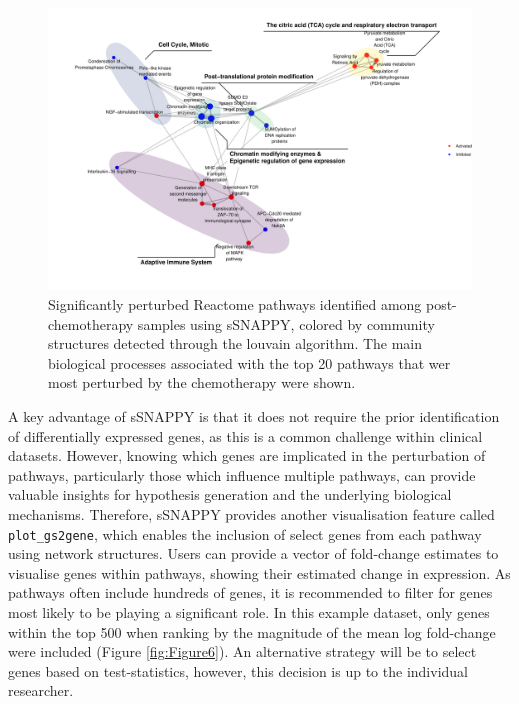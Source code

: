 \documentclass[9pt,a4paper,]{extarticle}
\begin{document}
\begin{figure}

{\centering \includegraphics[width=1\linewidth]{sSNAPPY_paper_files/figure-latex/Figure5-1} 

}

\caption{Significantly perturbed Reactome pathways identified among post-chemotherapy samples using sSNAPPY, colored by community structures detected through the louvain algorithm. The main biological processes associated with the top 20 pathways that wer most perturbed by the chemotherapy were shown.}\label{fig:Figure5}
\end{figure}

A key advantage of sSNAPPY is that it does not require the prior identification of differentially expressed genes, as this is a common challenge within clinical datasets.
However, knowing which genes are implicated in the perturbation of pathways, particularly those which influence multiple pathways, can provide valuable insights for hypothesis generation and the underlying biological mechanisms.
Therefore, sSNAPPY provides another visualisation feature called \texttt{plot\_gs2gene}, which enables the inclusion of select genes from each pathway using network structures.
Users can provide a vector of fold-change estimates to visualise genes within pathways, showing their estimated change in expression.
As pathways often include hundreds of genes, it is recommended to filter for genes most likely to be playing a significant role.
In this example dataset, only genes within the top 500 when ranking by the magnitude of the mean log fold-change were included (Figure \ref{fig:Figure6}).
An alternative strategy will be to select genes based on test-statistics, however, this decision is up to the individual researcher.
\end{document}
